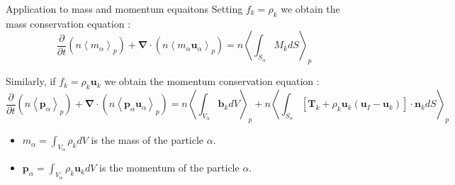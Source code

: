 \documentclass{sintefbeamer}
\newcommand{\pavg}[1]{n \left<#1\right>_p}
\newcommand{\nablab}{\bm{\nabla}}
\newcommand{\pddt}{\frac{\partial}{\partial t}}
\begin{document}
\begin{frame}
  {Application to mass and momentum equaitons}
  Setting $f_k = \rho_k$ we obtain the mass conservation equation :
  \begin{equation}
    \pddt   \left(\pavg{m_\alpha}\right)
    + \nablab \cdot \left(\pavg{m_\alpha \textbf{u}_\alpha}\right) 
    = 
     \pavg{\int_{S_\alpha} M_k d S}
    \label{eq:avg_p_global}
\end{equation}

Similarly, if $f_k = \rho_k \textbf{u}_k$ we obtain the momentum conservation equation :
\begin{equation}
    \pddt   \left(\pavg{\textbf{p}_\alpha}\right)
    + \nablab \cdot \left(\pavg{\textbf{p}_\alpha \textbf{u}_\alpha}\right) 
    = \pavg{\int_{V_\alpha} \textbf{b}_k dV}
    + \pavg{\int_{S_\alpha} \left[\textbf{T}_k + \rho_k \textbf{u}_k (\textbf{u}_I-\textbf{u}_k) \right] \cdot \textbf{n}_k d S}
    \label{eq:avg_p_global}
\end{equation}
\begin{itemize}
  \item $m_\alpha = \int_{V_\alpha} \rho_k dV$ is the mass of the particle $\alpha$.
  \item $\textbf{p}_\alpha = \int_{V_\alpha} \rho_k \textbf{u}_k dV$ is the momentum of the particle $\alpha$.
\end{itemize}
\end{frame}
  
\end{document}
